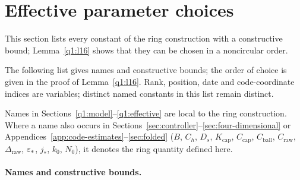 \section{Effective parameter choices}\label{q1:parameters}
This section lists every constant of the ring construction with a constructive bound; Lemma~\ref{q1:l16} shows that they can be chosen in a noncircular order.

The following list gives names and constructive bounds; the order of
choice is given in the proof of Lemma~\ref{q1:l16}. Rank, position, date and code-coordinate indices are variables; distinct named constants in this list remain distinct.

Names in Sections~\ref{q1:model}--\ref{q1:effective} are local to the ring construction. Where a name also occurs in Sections~\ref{sec:controller}--\ref{sec:four-dimensional} or Appendices~\ref{app:code-estimates}--\ref{sec:folded} (\(B\), \(C_h\), \(D_s\), \(K_{\mathrm{cap}}\), \(C_{\mathrm{cap}}\), \(C_{\mathrm{ball}}\), \(C_{\mathrm{raw}}\), \(\Delta_{\mathrm{raw}}\), \(\varepsilon_*\), \(j_*\), \(k_0\), \(N_0\)), it denotes the ring quantity defined here.

\paragraph{Names and constructive bounds.}

